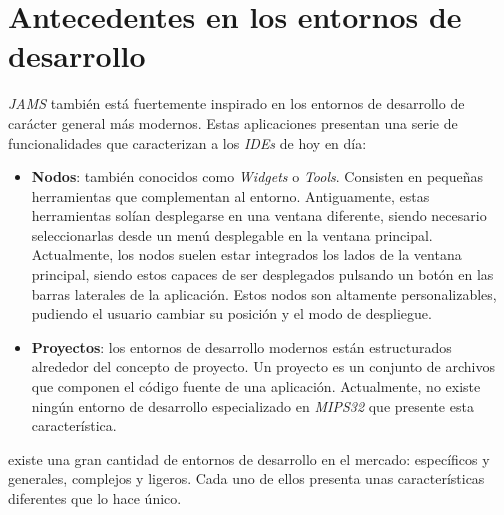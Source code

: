 \section{Antecedentes en los entornos de desarrollo}
\label{sec:antecedentes-en-los-entornos-de-desarrollo}

\textit{JAMS} también está fuertemente inspirado en los
entornos de desarrollo de carácter general más modernos.
Estas aplicaciones presentan una serie de funcionalidades que
caracterizan a los \textit{IDEs} de hoy en día:

\begin{itemize}
    \item \textbf{Nodos}: también conocidos como \textit{Widgets} o \textit{Tools}.
    Consisten en pequeñas herramientas que complementan al entorno.
    Antiguamente, estas herramientas solían desplegarse en una ventana diferente,
    siendo necesario seleccionarlas desde un menú desplegable en la ventana principal.
    Actualmente, los nodos suelen estar integrados  los lados de la ventana principal,
    siendo estos capaces de ser desplegados pulsando un botón en las barras laterales
    de la aplicación.
    Estos nodos son altamente personalizables, pudiendo el usuario cambiar su posición
    y el modo de despliegue.
    \item \textbf{Proyectos}: los entornos de desarrollo modernos están estructurados
    alrededor del concepto de proyecto.
    Un proyecto es un conjunto de archivos que componen el código fuente de una aplicación.
    Actualmente, no existe ningún entorno de desarrollo especializado en \textit{MIPS32}
    que presente esta característica.
\end{itemize}

 existe una gran cantidad de entornos de desarrollo en el mercado:
específicos y generales, complejos y ligeros.
Cada uno de ellos presenta unas características diferentes que lo hace único.

